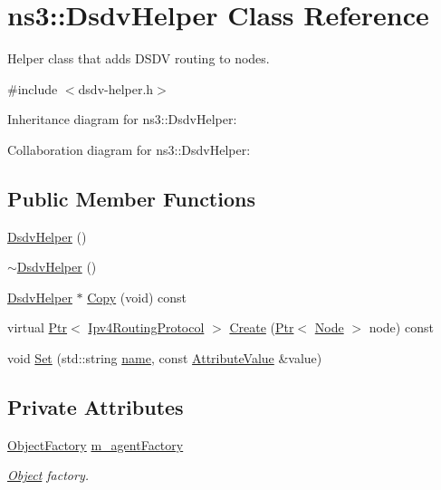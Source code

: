 \hypertarget{classns3_1_1DsdvHelper}{}\section{ns3\+:\+:Dsdv\+Helper Class Reference}
\label{classns3_1_1DsdvHelper}


Helper class that adds D\+S\+DV routing to nodes.  




{\ttfamily \#include $<$dsdv-\/helper.\+h$>$}



Inheritance diagram for ns3\+:\+:Dsdv\+Helper\+:


Collaboration diagram for ns3\+:\+:Dsdv\+Helper\+:
\subsection*{Public Member Functions}
\begin{DoxyCompactItemize}
\item 
\hyperlink{classns3_1_1DsdvHelper_a11c9f92c437873b26f74a90e6ee3a50f}{Dsdv\+Helper} ()
\item 
\hyperlink{classns3_1_1DsdvHelper_a48e7358c05a950535cc83cb66526a958}{$\sim$\+Dsdv\+Helper} ()
\item 
\hyperlink{classns3_1_1DsdvHelper}{Dsdv\+Helper} $\ast$ \hyperlink{classns3_1_1DsdvHelper_aa970c778597f490eba0377253eeb68a6}{Copy} (void) const 
\item 
virtual \hyperlink{classns3_1_1Ptr}{Ptr}$<$ \hyperlink{classns3_1_1Ipv4RoutingProtocol}{Ipv4\+Routing\+Protocol} $>$ \hyperlink{classns3_1_1DsdvHelper_a3ddb5f954a8c681cf8d1b0bee78f772f}{Create} (\hyperlink{classns3_1_1Ptr}{Ptr}$<$ \hyperlink{classns3_1_1Node}{Node} $>$ node) const 
\item 
void \hyperlink{classns3_1_1DsdvHelper_a782571eeded1e3e5978f4b430cd2bc2f}{Set} (std\+::string \hyperlink{generate__test__data__lte__spectrum__model_8m_ab74e6bf80237ddc4109968cedc58c151}{name}, const \hyperlink{classns3_1_1AttributeValue}{Attribute\+Value} \&value)
\end{DoxyCompactItemize}
\subsection*{Private Attributes}
\begin{DoxyCompactItemize}
\item 
\hyperlink{classns3_1_1ObjectFactory}{Object\+Factory} \hyperlink{classns3_1_1DsdvHelper_a03dd1fd69604f6c355fa51c6898cd0a1}{m\+\_\+agent\+Factory}
\begin{DoxyCompactList}\small\item\em \hyperlink{classns3_1_1Object}{Object} factory. \end{DoxyCompactList}\end{DoxyCompactItemize}

